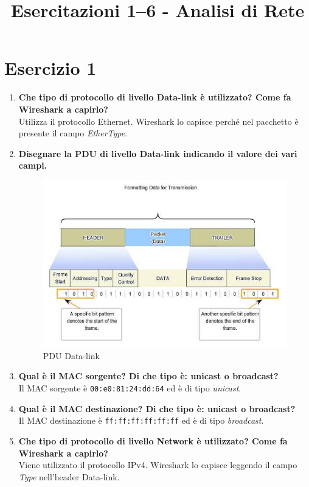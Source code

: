 \documentclass[a4paper,12pt]{article}
\title{Esercitazioni 1--6 - Analisi di Rete}
\author{}
\date{}
\begin{document}
\maketitle

\section*{Esercizio 1}
\begin{enumerate}
  \item \textbf{Che tipo di protocollo di livello Data-link è utilizzato? Come fa Wireshark a capirlo?}\\
    Utilizza il protocollo Ethernet. Wireshark lo capisce perché nel pacchetto è presente il campo \emph{EtherType}.
  \item \textbf{Disegnare la PDU di livello Data-link indicando il valore dei vari campi.}\\
    \begin{figure}[h]
      \centering
      \includegraphics[width=0.8\linewidth]{src/foto_PDU_DataLink.png}
      \caption{PDU Data-link}
    \end{figure}
  \item \textbf{Qual è il MAC sorgente? Di che tipo è: unicast o broadcast?}\\
    Il MAC sorgente è \texttt{00:e0:81:24:dd:64} ed è di tipo \emph{unicast}.
  \item \textbf{Qual è il MAC destinazione? Di che tipo è: unicast o broadcast?}\\
    Il MAC destinazione è \texttt{ff:ff:ff:ff:ff:ff} ed è di tipo \emph{broadcast}.
  \item \textbf{Che tipo di protocollo di livello Network è utilizzato? Come fa Wireshark a capirlo?}\\
    Viene utilizzato il protocollo IPv4. Wireshark lo capisce leggendo il campo \emph{Type} nell'header Data-link.

\end{enumerate}
\end{document}
